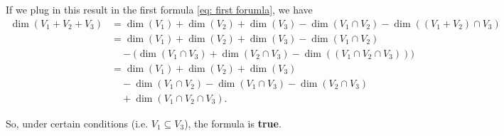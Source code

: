 \begin{xrcs}
\begin{xsol}
    If we plug in this result in the first formula \eqref{eq: first forumla}, we have
    \begin{equation}
      \begin{aligned}
        \dim (V_1 + V_2 + V_3)
        &= \dim (V_1) + \dim (V_2) + \dim (V_3) - \dim (V_1 \cap V_2) - \dim ((V_1 + V_2) \cap V_3) \\
        &= \dim (V_1) + \dim (V_2) + \dim (V_3) - \dim (V_1 \cap V_2) \\
        &\quad - \big(\dim (V_1 \cap V_3) + \dim (V_2 \cap V_3) - \dim ((V_1 \cap V_2 \cap V_3)) \big) \\
        &= \dim (V_1) + \dim (V_2) + \dim (V_3) \\
        & \quad - \dim(V_1 \cap V_2) - \dim (V_1 \cap V_3) - \dim (V_2 \cap V_3) \\
        & \quad + \dim (V_1 \cap V_2 \cap V_3).
      \end{aligned}
    \end{equation}

    So, under certain conditions (i.e. $V_1 \subseteq V_3$), the formula is \textbf{true}.
  \end{xsol}
\end{xrcs}

